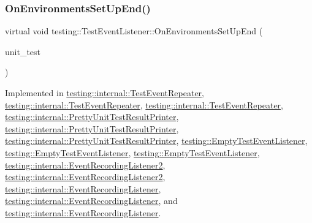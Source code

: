 \subsubsection{\texorpdfstring{OnEnvironmentsSetUpEnd()}{OnEnvironmentsSetUpEnd()}\hspace{0.1cm}{\footnotesize\ttfamily [2/3]}}
{\footnotesize\ttfamily virtual void testing\+::\+Test\+Event\+Listener\+::\+On\+Environments\+Set\+Up\+End (\begin{DoxyParamCaption}\item[{const \mbox{\hyperlink{classtesting_1_1_unit_test}{Unit\+Test}} \&}]{unit\+\_\+test }\end{DoxyParamCaption})\hspace{0.3cm}{\ttfamily [pure virtual]}}



Implemented in \mbox{\hyperlink{classtesting_1_1internal_1_1_test_event_repeater_a744eeb6ddfcba78b34515fac7f1ab704}{testing\+::internal\+::\+Test\+Event\+Repeater}}, \mbox{\hyperlink{classtesting_1_1internal_1_1_test_event_repeater_a744eeb6ddfcba78b34515fac7f1ab704}{testing\+::internal\+::\+Test\+Event\+Repeater}}, \mbox{\hyperlink{classtesting_1_1internal_1_1_test_event_repeater_a3a92696df942dc92f985e52fddd6d303}{testing\+::internal\+::\+Test\+Event\+Repeater}}, \mbox{\hyperlink{classtesting_1_1internal_1_1_pretty_unit_test_result_printer_a9853207ad1aedfe89c72f8047ac3541a}{testing\+::internal\+::\+Pretty\+Unit\+Test\+Result\+Printer}}, \mbox{\hyperlink{classtesting_1_1internal_1_1_pretty_unit_test_result_printer_a9853207ad1aedfe89c72f8047ac3541a}{testing\+::internal\+::\+Pretty\+Unit\+Test\+Result\+Printer}}, \mbox{\hyperlink{classtesting_1_1internal_1_1_pretty_unit_test_result_printer_aadba892f02606a8b0c5f5982b3553aac}{testing\+::internal\+::\+Pretty\+Unit\+Test\+Result\+Printer}}, \mbox{\hyperlink{classtesting_1_1_empty_test_event_listener_a9b4e781c0b38065a55c2fd163724ba69}{testing\+::\+Empty\+Test\+Event\+Listener}}, \mbox{\hyperlink{classtesting_1_1_empty_test_event_listener_a9b4e781c0b38065a55c2fd163724ba69}{testing\+::\+Empty\+Test\+Event\+Listener}}, \mbox{\hyperlink{classtesting_1_1_empty_test_event_listener_abc481c6648d15d4242245195a06f5aa0}{testing\+::\+Empty\+Test\+Event\+Listener}}, \mbox{\hyperlink{classtesting_1_1internal_1_1_event_recording_listener2_ae6a3c429dd5df55c869377186411a90a}{testing\+::internal\+::\+Event\+Recording\+Listener2}}, \mbox{\hyperlink{classtesting_1_1internal_1_1_event_recording_listener2_ae6a3c429dd5df55c869377186411a90a}{testing\+::internal\+::\+Event\+Recording\+Listener2}}, \mbox{\hyperlink{classtesting_1_1internal_1_1_event_recording_listener_ada752f5c75723828ed8661c513edbd10}{testing\+::internal\+::\+Event\+Recording\+Listener}}, \mbox{\hyperlink{classtesting_1_1internal_1_1_event_recording_listener_ada752f5c75723828ed8661c513edbd10}{testing\+::internal\+::\+Event\+Recording\+Listener}}, and \mbox{\hyperlink{classtesting_1_1internal_1_1_event_recording_listener_a40b4c5e05abd1aa11a030f999f6adb8f}{testing\+::internal\+::\+Event\+Recording\+Listener}}.


